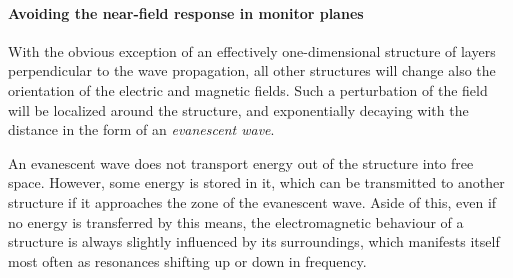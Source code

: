\paragraph{Avoiding the near-field response in monitor planes} %
\label{par_nearfield}
With the obvious exception of an effectively one-dimensional structure of layers perpendicular to the wave propagation, all other structures will change also the orientation of the electric and magnetic fields. Such a perturbation of the field will be localized around the structure, and exponentially decaying with the distance in the form of an \textit{evanescent wave}.

An evanescent wave does not transport energy out of the structure into free space. However, some energy is stored in it, which can be transmitted to another structure if it approaches the zone of the evanescent wave. Aside of this, even if no energy is transferred by this means, the electromagnetic behaviour of a structure is always slightly influenced by its surroundings, which manifests itself most often as resonances shifting up or down in frequency.

